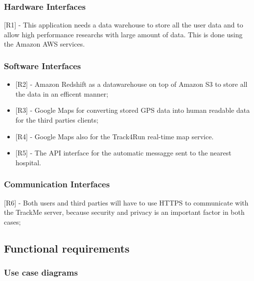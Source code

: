 {\color{secblue}\subsubsection{Hardware Interfaces}}
[R1] - This application needs a data warehouse to store all the user data and to allow high performance researchs with large amount of data. This is done using the Amazon AWS services.
{\color{secblue}\subsubsection{Software Interfaces}}
\begin{itemize}
\item{} [R2] - Amazon Redshift as a datawarehouse on top of Amazon S3 to store all the data in an efficent manner;
\item{} [R3] - Google Maps for converting stored GPS data into human readable data for the third parties clients;
\item{} [R4] - Google Maps also for the Track4Run real-time map service.
\item{} [R5] - The API interface for the automatic messagge sent to the nearest hospital.
\end{itemize}
{\color{secblue}\subsubsection{Communication Interfaces}}
[R6] - Both users and third parties will have to use HTTPS to communicate with the TrackMe server, because security and privacy is an important factor in both cases;
\newpage
{\color{secblue}\subsection{Functional requirements}}
{\color{secblue}\subsubsection{Use case diagrams}}
 
